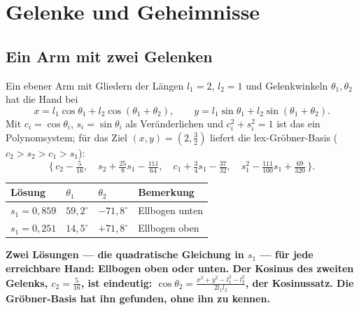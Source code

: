 \chapter{Gelenke und Geheimnisse}

\section{Ein Arm mit zwei Gelenken}

\begin{merksatz}
Ein ebener Arm mit Gliedern der Längen $l_1 = 2$, $l_2 = 1$ und Gelenkwinkeln $\theta_1, \theta_2$ hat die Hand bei
\[ x = l_1\cos\theta_1 + l_2\cos(\theta_1 + \theta_2), \qquad y = l_1\sin\theta_1 + l_2\sin(\theta_1 + \theta_2) . \]
Mit $c_i = \cos\theta_i$, $s_i = \sin\theta_i$ als Veränderlichen und $c_i^{2} + s_i^{2} = 1$ ist das ein Polynomsystem; für das Ziel $(x, y) = (2, \tfrac32)$ liefert die lex-Gröbner-Basis ($c_2 > s_2 > c_1 > s_1$):
\[ \bigl\{\,c_2 - \tfrac{5}{16},\quad s_2 + \tfrac{25}{8}s_1 - \tfrac{111}{64},\quad c_1 + \tfrac34s_1 - \tfrac{37}{32},\quad s_1^{2} - \tfrac{111}{100}s_1 + \tfrac{69}{320}\,\bigr\} . \]

\begin{center}
{\small
\renewcommand{\arraystretch}{1.46}
\begin{tabular}{@{}P{2.2cm}P{1.4cm}P{1.4cm}P{3.6cm}@{}}
\toprule
\textbf{Lösung} & $\theta_1$ & $\theta_2$ & \textbf{Bemerkung}\\
\midrule
$s_1 = 0{,}859$ & $59{,}2^{\circ}$ & $-71{,}8^{\circ}$ & Ellbogen unten\\
$s_1 = 0{,}251$ & $14{,}5^{\circ}$ & $+71{,}8^{\circ}$ & Ellbogen oben\\
\bottomrule
\end{tabular}}
\end{center}

\begin{center}
\begin{minipage}{0.9\textwidth}
\textbf{Zwei Lösungen --- die quadratische Gleichung in $s_1$ --- für jede erreichbare Hand: Ellbogen oben oder unten. Der Kosinus des zweiten Gelenks, $c_2 = \tfrac{5}{16}$, ist eindeutig: $\cos\theta_2 = \frac{x^{2} + y^{2} - l_1^{2} - l_2^{2}}{2l_1l_2}$, der Kosinussatz. Die Gröbner-Basis hat ihn gefunden, ohne ihn zu kennen.}
\end{minipage}
\end{center}


\end{merksatz}
